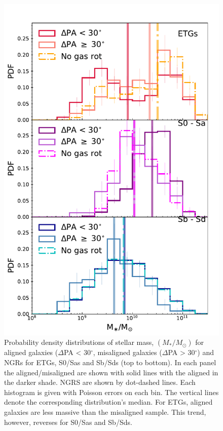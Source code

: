\documentclass[fleqn,usenatbib]{mnras}
\begin{document}
\begin{figure}
	\includegraphics[width=\linewidth]{morph/delPA_stelM_morph.pdf}
    \caption{Probability density distributions of stellar mass, $(M_{\ast}/M_{\odot})$ for aligned galaxies ($\Delta$PA < 30$^{\circ}$, misaligned galaxies ($\Delta$PA > 30$^{\circ}$) and NGRs for ETGs, S0/Sas and Sb/Sds (top to bottom). In each panel the aligned/misaligned are shown with solid lines with the aligned in the darker shade. NGRS are shown by dot-dashed lines. Each histogram is given with Poisson errors on each bin. The vertical lines denote the corresponding distribution's median. For ETGs, aligned galaxies are less massive than the misaligned sample. This trend, however, reverses for S0/Sas and Sb/Sds.}
    \label{fig:morph_stelM}
\end{figure}
\end{document}
